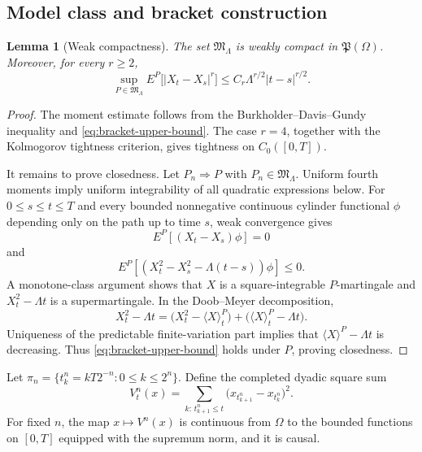 \documentclass[11pt,reqno]{amsart}
\theoremstyle{plain}
\newtheorem{lemma}[lemma]{Lemma}
\theoremstyle{definition}
\newcommand{\abs}[1]{\left\lvert #1\right\rvert}
\begin{document}
\subsection{Model class and bracket construction}

\begin{lemma}[Weak compactness]\label{lem:model-compactness}
The set \(\mathfrak M_\Lambda\) is weakly compact in
\(\mathfrak P(\Omega)\).  Moreover, for every \(r\ge2\),
\begin{equation}\label{eq:martingale-moment}
  \sup_{P\in\mathfrak M_\Lambda}
  E^P\bigl[\abs{X_t-X_s}^r\bigr]
  \le C_r\Lambda^{r/2}\abs{t-s}^{r/2}.
\end{equation}
\end{lemma}

\begin{proof}
The moment estimate follows from the Burkholder--Davis--Gundy inequality and
\eqref{eq:bracket-upper-bound}.  The case \(r=4\), together with the
Kolmogorov tightness criterion, gives tightness on \(C_0([0,T])\).

It remains to prove closedness.  Let \(P_n\Rightarrow P\) with
\(P_n\in\mathfrak M_\Lambda\).  Uniform fourth moments imply uniform
integrability of all quadratic expressions below.  For
\(0\le s\le t\le T\) and every bounded nonnegative continuous cylinder
functional \(\phi\) depending only on the path up to time \(s\), weak
convergence gives
\[
  E^P[(X_t-X_s)\phi]=0
\]
and
\[
  E^P[(X_t^2-X_s^2-\Lambda(t-s))\phi]\le0.
\]
A monotone-class argument shows that \(X\) is a square-integrable
\(P\)-martingale and \(X_t^2-\Lambda t\) is a supermartingale.  In the
Doob--Meyer decomposition,
\[
  X_t^2-\Lambda t
  =\bigl(X_t^2-\langle X\rangle_t^P\bigr)
   +\bigl(\langle X\rangle_t^P-\Lambda t\bigr).
\]
Uniqueness of the predictable finite-variation part implies that
\(\langle X\rangle^P-\Lambda t\) is decreasing.  Thus
\eqref{eq:bracket-upper-bound} holds under \(P\), proving closedness.
\end{proof}

Let \(\pi_n=\{t_k^n=kT2^{-n}:0\le k\le2^n\}\).  Define the completed
dyadic square sum
\begin{equation}\label{eq:completed-qv-sum}
  V_t^n(x)
  =
  \sum_{k:\,t_{k+1}^n\le t}
  \bigl(x_{t_{k+1}^n}-x_{t_k^n}\bigr)^2.
\end{equation}
For fixed \(n\), the map \(x\mapsto V^n(x)\) is continuous from \(\Omega\)
to the bounded functions on \([0,T]\) equipped with the supremum norm, and
it is causal.
\end{document}
